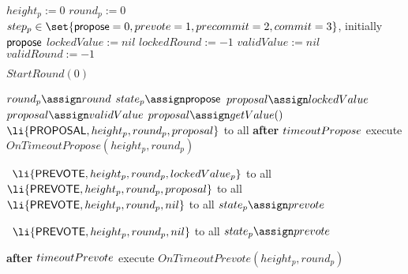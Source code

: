 \begin{algorithm}[htb!]
\def\baselinestretch{1}
\scriptsize\raggedright
\begin{algorithmic}[1]
\SHORTSPACE
\INIT{}
  \STATE $height_p := 0$ 
  \STATE $round_p := 0$    
  \STATE $step_p  \in \set{\propose=0, \prevote=1, \precommit=2, \commit=3}$, initially $\mathsf{propose}$   
  \STATE $lockedValue := nil$
  \STATE $lockedRound := -1$ 
  \STATE $validValue := nil$
  \STATE $validRound := -1$
\ENDINIT

\SPACE
{}
  \STATE $StartRound(0)$
\ENDUPON

\SPACE
{} \label{line:tab:startRound}
\STATE $round_p \assign round$
\STATE $state_p \assign \propose$
		\STATE $proposal \assign lockedValue$
		\STATE $proposal \assign validValue$
	\ELSE
		\STATE $proposal \assign getValue()$	
	\ENDIF 	  
	\STATE \PBroadcast\ $\li{\Proposal,height_p, round_p, proposal}$ to all \label{line:tab:send-proposal}
\ENDIF
\STATE \textbf{after} $timeoutPropose$ execute $OnTimeoutPropose(height_p, round_p)$
\ENDFUNCTION

\SPACE
{} \label{line:tab:recvProposal} 
   \label{line:tab:hasLockedValue}
 	\STATE \PBroadcast \ $\li{\Prevote,height_p,round_p,lockedValue_p}$ to all \label{line:tab:send-locked-value}
  \label{line:tab:locked-value-nil} 
   \STATE \PBroadcast \ $\li{\Prevote,height_p,round_p,proposal}$ to all \label{line:tab:send-prevote}
 \ELSE
   \STATE \PBroadcast \ $\li{\Prevote,height_p,round_p,\nil}$ to all \label{line:tab:send-prevote-nil}	
 \ENDIF
 \STATE $state_p \assign \prevote$ \label{line:tab:setStateToPrevote}
\ENDUPON

\SPACE
{} \label{line:tab:onTimeoutPropose}
	\STATE \PBroadcast \ $\li{\Prevote,height_p,round_p,\nil}$ to all 
	\STATE $state_p \assign \prevote$  
\ENDIF	
\ENDFUNCTION

\SPACE
{} \label{line:tab:recvAny2/3Prevote}
	\STATE \textbf{after} $timeoutPrevote$ execute $OnTimeoutPrevote(height_p, round_p)$ \label{line:tab:timeoutPrevote}
\ENDUPON


\end{algorithmic}
\end{algorithm}

